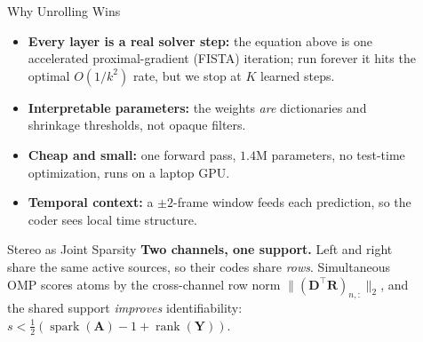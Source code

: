 \documentclass[final,17pt]{beamer}
\newcommand{\lead}[1]{\textbf{\color{dgreen}#1}}
\newcommand{\norm}[1]{\lVert#1\rVert}
\DeclareMathOperator{\spark}{spark}
\newlength{\sepwidth}\newlength{\colwidth}
\newcommand{\separatorcolumn}{\begin{column}{\sepwidth}\end{column}}
\begin{document}
\begin{frame}[t]
\begin{columns}[t]
\begin{column}{\colwidth}
\begin{block}{Why Unrolling Wins}
\begin{itemize}
\item \lead{Every layer is a real solver step:} the equation above is one
accelerated proximal-gradient (FISTA) iteration; run forever it hits the optimal
$O(1/k^2)$ rate, but we stop at $K$ learned steps.
\item \lead{Interpretable parameters:} the weights \emph{are} dictionaries and
shrinkage thresholds, not opaque filters.
\item \lead{Cheap and small:} one forward pass, $1.4$M parameters, no
test-time optimization, runs on a laptop GPU.
\item \lead{Temporal context:} a $\pm2$-frame window feeds each prediction, so the
coder sees local time structure.
\end{itemize}
\end{block}

\begin{block}{Stereo as Joint Sparsity}
\lead{Two channels, one support.} Left and right share the same active sources, so
their codes share \emph{rows}. Simultaneous OMP scores atoms by the cross-channel
row norm $\norm{(\bm{D}^\top\bm{R})_{n,:}}_2$, and the shared support \emph{improves}
identifiability: $s<\tfrac12(\spark(\bm{A})-1+\operatorname{rank}(\bm{Y}))$.
\end{block}

\end{column}
\separatorcolumn

\begin{column}{\colwidth}


\end{column}
\end{columns}
\end{frame}
\end{document}
